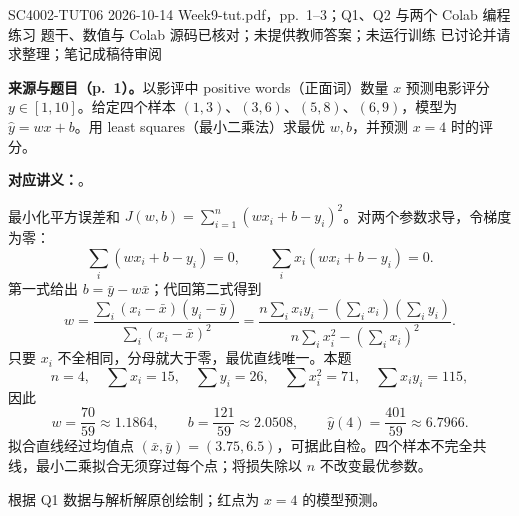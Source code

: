 
\begingroup
\renewcommand{\recordid}[1]{}
\label{tutorial:SC4002-TUT06}

\tutorialmeta
  {SC4002-TUT06}
  {2026-10-14}
  {Week9-tut.pdf，pp.~1--3；Q1、Q2 与两个 Colab 编程练习}
  {题干、数值与 Colab 源码已核对；未提供教师答案；未运行训练}
  {已讨论并请求整理；笔记成稿待审阅}

\nopagebreak[4]

\textbf{来源与题目（p.~1）。}以影评中 positive words（正面词）数量 $x$ 预测电影评分 $y\in[1,10]$。给定四个样本 $(1,3)$、$(3,6)$、$(5,8)$、$(6,9)$，模型为 $\hat y=wx+b$。用 least squares（最小二乘法）求最优 $w,b$，并预测 $x=4$ 时的评分。

\textbf{对应讲义：}。

\begin{checkedsolution}
最小化平方误差和 $J(w,b)=\sum_{i=1}^{n}(wx_i+b-y_i)^2$。对两个参数求导，令梯度为零：
\[
 \sum_i(wx_i+b-y_i)=0,\qquad
 \sum_i x_i(wx_i+b-y_i)=0.
\]
第一式给出 $b=\bar y-w\bar x$；代回第二式得到
\[
 w=\frac{\sum_i(x_i-\bar x)(y_i-\bar y)}{\sum_i(x_i-\bar x)^2}
 =\frac{n\sum_i x_i y_i-(\sum_i x_i)(\sum_i y_i)}
 {n\sum_i x_i^2-(\sum_i x_i)^2}.
\]
只要 $x_i$ 不全相同，分母就大于零，最优直线唯一。本题
\[
 n=4,\quad \sum x_i=15,\quad \sum y_i=26,\quad
 \sum x_i^2=71,\quad \sum x_i y_i=115,
\]
因此
\[
 \boxed{w=\frac{70}{59}\approx1.1864,\qquad
 b=\frac{121}{59}\approx2.0508,\qquad
 \hat y(4)=\frac{401}{59}\approx6.7966.}
\]
拟合直线经过均值点 $(\bar x,\bar y)=(3.75,6.5)$，可据此自检。四个样本不完全共线，最小二乘拟合无须穿过每个点；将损失除以 $n$ 不改变最优参数。

\begin{center}


{\small 根据 Q1 数据与解析解原创绘制；红点为 $x=4$ 的模型预测。}
\end{center}
\end{checkedsolution}

\nopagebreak[4]

